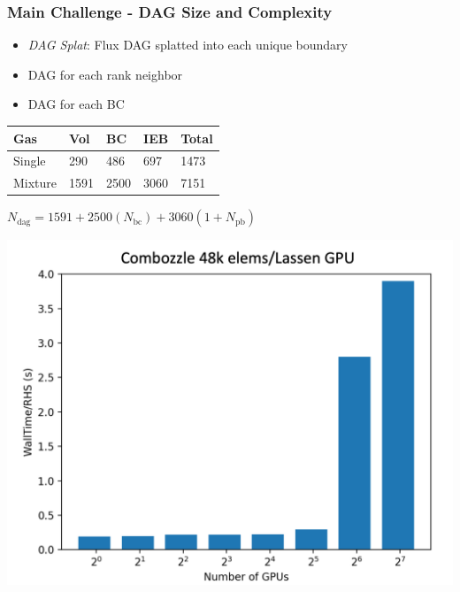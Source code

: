 \begin{frame}\frametitle{Main Challenge - DAG Size and Complexity}
\vspace{10pt}
\begin{minipage}[t][0.4\textheight][t]{\textwidth}
\begin{multicols}{2}
\begin{itemize}
\item \textit{DAG Splat}: Flux DAG splatted into each unique boundary
\item DAG for each rank neighbor
\item DAG for each BC
\end{itemize}
\columnbreak
\begin{table}
\centering
\begin{tabularx}{\linewidth}{|X|X|X|X|X|}
\hline
\textbf{Gas} & \textbf{Vol} & \textbf{BC} & \textbf{IEB} & \textbf{Total} \\ \hline
Single & 290 & 486 & 697 & 1473 \\ \hline
Mixture & 1591 & 2500 & 3060 & 7151 \\ \hline
\end{tabularx}
$N_{\text{dag}} = 1591 + 2500(N_{\text{bc}}) + 3060(1 + N_{\text{pb}})$
\end{table}
\end{multicols}
\end{minipage}\vfill
\vspace{-20pt}
\begin{minipage}[t][0.4\textheight][t]{\textwidth}
\centering
\includegraphics[width=.4\textwidth]{Figures/mtc/combozzle_weak_bad_partitioning.png}\hspace{30pt}

\end{minipage}
\end{frame}
